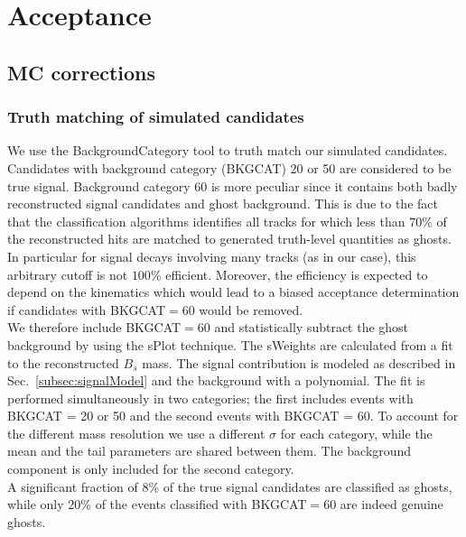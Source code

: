 \section{Acceptance}
\label{sec:Acceptance}

\subsection{MC corrections}

\subsubsection{Truth matching of simulated candidates}

We use the \textsf{BackgroundCategory} tool to truth match our simulated candidates. 
Candidates with background category (\textsf{BKGCAT}) 20 or 50 are considered to be true signal. 
Background category 60 is more peculiar since it contains both badly reconstructed
signal candidates and ghost background.
This is due to the fact that the classification algorithms identifies all tracks 
for which less than $70\%$ of the reconstructed hits are matched to generated truth-level quantities as ghosts.
In particular for signal decays involving many tracks (as in our case),
this arbitrary cutoff is not $100\%$ efficient.
Moreover, the efficiency is expected to depend on the kinematics which would lead to a biased acceptance determination
if candidates with \textsf{BKGCAT}$=60$ would be removed. \\
We therefore include \textsf{BKGCAT}$=60$ and statistically subtract the ghost background by using the \textsf{sPlot} technique.
The \textsf{sWeights} are calculated from a fit to the reconstructed $B_s$ mass.  
The signal contribution is modeled as described in Sec.~\ref{subsec:signalModel} and the background with a polynomial.
The fit is performed simultaneously in two categories; the first includes events with \textsf{BKGCAT} = 20 or 50 and
the second events with \textsf{BKGCAT}  = 60.
To account for the different mass resolution we use a different $\sigma$ for each category,
while the mean and the tail parameters are shared between them. 
The background component is only included for the second category.
\\
A significant fraction of $8\%$ of the true signal candidates are classified as ghosts,
while only $20 \%$ of the events classified with \textsf{BKGCAT}$=60$ are indeed genuine ghosts.




